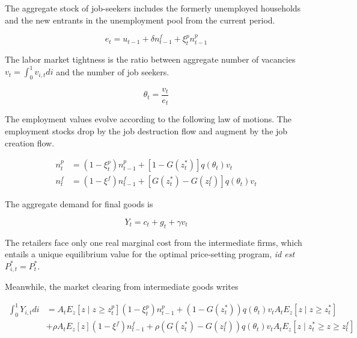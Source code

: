 \documentclass[a4paper]{article}
\begin{document}
The aggregate stock of job-seekers includes the formerly unemployed households and the new entrants in the unemployment pool from the current period.

\begin{equation}
e_t = u_{t-1} + \delta n_{t-1}^f + \xi_t^p n_{t-1}^p
\end{equation}

The labor market tightness is the ratio between aggregate number of vacancies $v_t = \int_{0}^{1} v_{i,t} di$ and the number of job seekers.

\begin{equation*}
\theta_t = \frac{v_t}{e_t}
\end{equation*}

The employment values evolve according to the following law of motions. The employment stocks drop by the job destruction flow and augment by the job creation flow.

\begin{align}
n_t^p &= \left( 1 - \xi_t^p \right) n_{t-1}^p + \left[ 1-G\left( z_t^*\right)\right]q\left(\theta_t\right) v_t\\
n_t^f &= \left( 1 - \xi^f \right) n_{t-1}^f + \left[ G\left( z_t^*\right)-G\left( z_t^f\right)\right]q\left(\theta_t\right) v_t
\end{align}

The aggregate demand for final goods is

\begin{equation}
Y_t = c_t + g_t + \gamma v_t \label{res_cons}
\end{equation}


The retailers face only one real marginal cost from the intermediate firms, which entails a unique equilibrium value for the optimal price-setting program, \emph{id est} $P_{i,t}^* = P_t^*$.

Meanwhile, the market clearing from intermediate goods writes

\begin{align*}
\int_{0}^{1} Y_{i,t} di &= A_t E_z \left[z \mid z \geq z_t^p \right] \left( 1 - \xi_t^p \right) n_{t-1}^p + \left( 1 - G\left( z_t^* \right)\right) q \left( \theta_t \right) v_t A_t E_z \left[z \mid z \geq z_t^* \right]\\
&+ \rho A_t E_z \left[ z \right] \left( 1 - \xi^f \right) n_{t-1}^f + \rho \left( G\left( z_t^* \right) - G\left( z_t^f \right)\right) q \left( \theta_t \right) v_t A_t E_z \left[z \mid z_t^* \geq z \geq z_t^f \right]
\end{align*}
\end{document}
